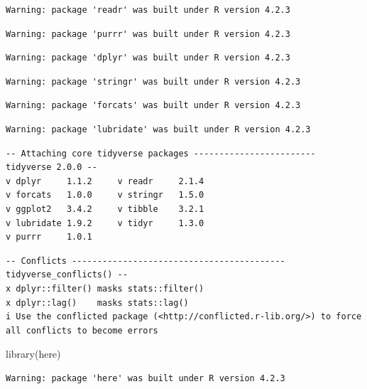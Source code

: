 \documentclass[
  letterpaper,
  DIV=11,
  numbers=noendperiod]{scrartcl}
\newenvironment{Shaded}{\begin{snugshade}}{\end{snugshade}}
\newcommand{\FunctionTok}[1]{\textcolor[rgb]{0.28,0.35,0.67}{#1}}
\newcommand{\NormalTok}[1]{\textcolor[rgb]{0.00,0.23,0.31}{#1}}
\begin{document}
\begin{verbatim}
Warning: package 'readr' was built under R version 4.2.3
\end{verbatim}

\begin{verbatim}
Warning: package 'purrr' was built under R version 4.2.3
\end{verbatim}

\begin{verbatim}
Warning: package 'dplyr' was built under R version 4.2.3
\end{verbatim}

\begin{verbatim}
Warning: package 'stringr' was built under R version 4.2.3
\end{verbatim}

\begin{verbatim}
Warning: package 'forcats' was built under R version 4.2.3
\end{verbatim}

\begin{verbatim}
Warning: package 'lubridate' was built under R version 4.2.3
\end{verbatim}

\begin{verbatim}
-- Attaching core tidyverse packages ------------------------ tidyverse 2.0.0 --
v dplyr     1.1.2     v readr     2.1.4
v forcats   1.0.0     v stringr   1.5.0
v ggplot2   3.4.2     v tibble    3.2.1
v lubridate 1.9.2     v tidyr     1.3.0
v purrr     1.0.1     
\end{verbatim}

\begin{verbatim}
-- Conflicts ------------------------------------------ tidyverse_conflicts() --
x dplyr::filter() masks stats::filter()
x dplyr::lag()    masks stats::lag()
i Use the conflicted package (<http://conflicted.r-lib.org/>) to force all conflicts to become errors
\end{verbatim}

\begin{Shaded}
\begin{Highlighting}[]
\FunctionTok{library}\NormalTok{(here)}
\end{Highlighting}
\end{Shaded}

\begin{verbatim}
Warning: package 'here' was built under R version 4.2.3
\end{verbatim}
\end{document}
